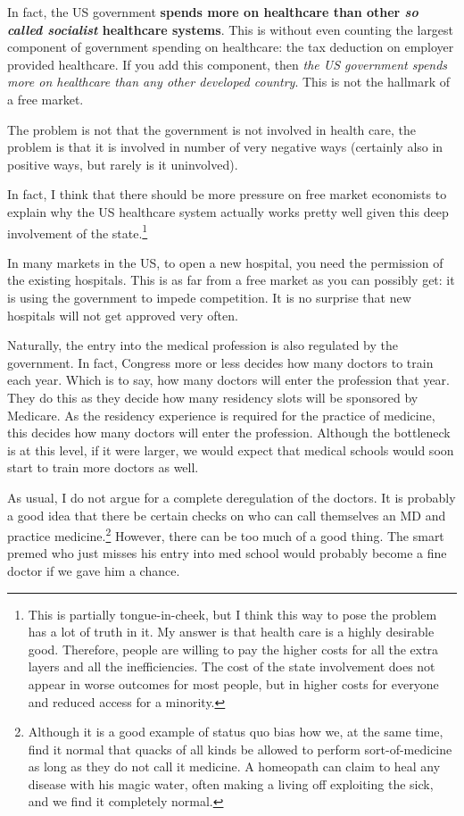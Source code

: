 In fact, the US government \textbf{spends more on healthcare than other
\emph{so called socialist} healthcare systems}. This is without even counting
the largest component of government spending on healthcare: the tax deduction
on employer provided healthcare. If you add this component, then \emph{the US
government spends more on healthcare than any other developed country}. This is
not the hallmark of a free market. %

The problem is not that the government is not involved in health care, the
problem is that it is involved in number of very negative ways (certainly also
in positive ways, but rarely is it uninvolved).

In fact, I think that there should be more pressure on free market economists
to explain why the US healthcare system actually works pretty well given this
deep involvement of the state.\footnote{This is partially tongue-in-cheek, but
I think this way to pose the problem has a lot of truth in it. My answer is
that health care is a highly desirable good. Therefore, people are willing to
pay the higher costs for all the extra layers and all the inefficiencies. The
cost of the state involvement does not appear in worse outcomes for most
people, but in higher costs for everyone and reduced access for a minority.}

In many markets in the US, to open a new hospital, you need the permission of
the existing hospitals. This is as far from a free market as you can possibly
get: it is using the government to impede competition. It is no surprise that
new hospitals will not get approved very often.

Naturally, the entry into the medical profession is also regulated by the
government. In fact, Congress more or less decides how many doctors to train
each year. Which is to say, how many doctors will enter the profession that
year. They do this as they decide how many residency slots will be sponsored by
Medicare. As the residency experience is required for the practice of medicine,
this decides how many doctors will enter the profession. Although the
bottleneck is at this level, if it were larger, we would expect that medical
schools would soon start to train more doctors as well.

As usual, I do not argue for a complete deregulation of the doctors. It is
probably a good idea that there be certain checks on who can call themselves an
MD and practice medicine.\footnote{Although it is a good example of status quo
bias how we, at the same time, find it normal that quacks of all kinds be
allowed to perform sort-of-medicine as long as they do not call it medicine. A
homeopath can claim to heal any disease with his magic water, often making a
living off exploiting the sick, and we find it completely normal.} However,
there can be too much of a good thing. The smart premed who just misses his
entry into med school would probably become a fine doctor if we gave him a
chance.

